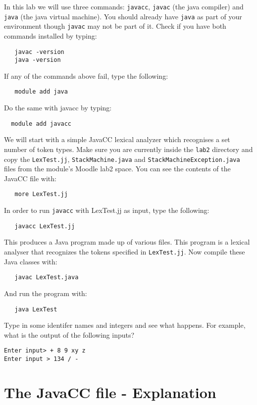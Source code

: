 \documentclass{article}
\begin{document}
In this lab we will use three commands: \verb+javacc+, \verb+javac+ (the java compiler) and \verb+java+ (the java virtual machine). You should already have \verb+java+ as part of your environment though \verb+javac+ may not be part of it. Check if you have both commands installed by typing:
\begin{verbatim}
   javac -version
   java -version
\end{verbatim}
If any of the commands above fail, type the following:
\begin{verbatim}
   module add java
\end{verbatim}
Do the same with javacc by typing:
\begin{verbatim}
  module add javacc
\end{verbatim}

We will start with a simple JavaCC lexical analyzer which recognises a set number of token types. Make sure you are currently inside the \verb+lab2+ directory and copy the \verb+LexTest.jj+, \verb+StackMachine.java+ and \verb+StackMachineException.java+ files from the module's Moodle lab2 space.
You can see the contents of the JavaCC  file with:
\begin{verbatim}
   more LexTest.jj
\end{verbatim}
In order to run \verb+javacc+ with LexTest.jj as input, type the following:
\begin{verbatim}
   javacc LexTest.jj
\end{verbatim}
This produces a Java program made up of various files. This program is a lexical analyser that recognizes the tokens specified in  \verb+LexTest.jj+. Now compile these Java classes with:
\begin{verbatim}
   javac LexTest.java
\end{verbatim}
And  run the program with:
\begin{verbatim}
   java LexTest
\end{verbatim}
Type in some identifer names and integers and see what happens. For example, what is the output of the following inputs?
\begin{verbatim}
Enter input> + 8 9 xy z
Enter input > 134 / -
\end{verbatim}


\section*{The JavaCC file - Explanation}
\end{document}
